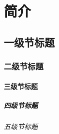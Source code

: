 \chapter{简介}

\section{一级节标题}

\subsection{二级节标题}

\subsubsection{三级节标题}

\paragraph{四级节标题}

\subparagraph{五级节标题}

